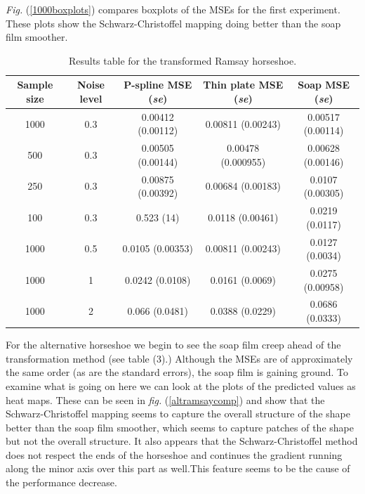 \documentclass[a4paper,10pt]{amsart}
\newcommand{\sch}{Schwarz-Christoffel }
\newcommand{\fig}[1]{\emph{fig.} (\ref{#1})}
\newcommand{\Fig}[1]{\emph{Fig.} (\ref{#1})}
\begin{document}
\Fig{1000boxplots} compares boxplots of the MSEs for the first experiment. These plots show the \sch mapping doing better than the soap film smoother.

\begin{table}[ht]
\begin{tabular}{c c c c c}\\
Sample size & Noise level & P-spline MSE (\emph{se}) & Thin plate MSE (\emph{se}) & Soap MSE (\emph{se}) \\
\hline
\hline
1000 & 0.3 & 0.00412 (0.00112) & 0.00811 (0.00243) & 0.00517 (0.00114) \\ 
500 & 0.3 & 0.00505 (0.00144) & 0.00478 (0.000955) & 0.00628 (0.00146) \\ 
250 & 0.3 & 0.00875 (0.00392) & 0.00684 (0.00183) & 0.0107 (0.00305) \\ 
100 & 0.3 & 0.523 (14) & 0.0118 (0.00461) & 0.0219 (0.0117) \\ 
1000 & 0.5 & 0.0105 (0.00353) & 0.00811 (0.00243) & 0.0127 (0.0034) \\ 
1000 & 1 & 0.0242 (0.0108) & 0.0161 (0.0069) & 0.0275 (0.00958) \\ 
1000 & 2 & 0.066 (0.0481) & 0.0388 (0.0229) & 0.0686 (0.0333) \\ 
\end{tabular}
\label{table2}
\caption{Results table for the transformed Ramsay horseshoe.}
\end{table}

For the alternative horseshoe we begin to see the soap film creep ahead of the transformation method (see table (3).) Although the MSEs are of approximately the same order (as are the standard errors), the soap film is gaining ground. To examine what is going on here we can look at the plots of the predicted values as heat maps. These can be seen in \fig{altramsaycomp} and show that the \sch mapping seems to capture the overall structure of the shape better than the soap film smoother, which seems to capture patches of the shape but not the overall structure. It also appears that the \sch method does not respect the ends of the horseshoe and continues the gradient running along the minor axis over this part as well.This feature seems to be the cause of the performance decrease.
\end{document}

